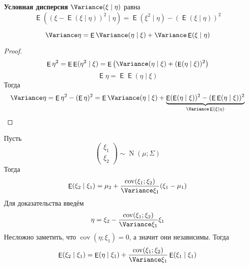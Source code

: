 \documentclass{article}
\DeclareMathOperator{\Expected}{\mathsf{E}}
\DeclareMathOperator{\Covariance}{cov}
\begin{document}
    \begin{definition}
        \textbf{Условная дисперсия} $\Variance(\xi\mid\eta)$ равна
        $$
        \Expected((\xi-\Expected(\xi\mid\eta))^2\mid\eta)=\Expected(\xi^2\mid\eta)-(\Expected(\xi\mid\eta))^2
        $$
    \end{definition}
    \begin{property}
        $$
        \Variance\eta=\Expected\Variance(\eta\mid\xi)+\Variance\Expected(\xi\mid\eta)
        $$
    \end{property}
    \begin{proof}
        $$
        \Expected\eta^2=\Expected\Expected(\eta^2\mid\xi)=\Expected\left(\Variance(\eta\mid\xi)+(\Expected(\eta\mid\xi))^2\right)
        $$
        $$
        \Expected\eta=\Expected\Expected(\eta\mid\xi)
        $$
        Тогда
        $$
        \Variance\eta=\Expected\eta^2-(\Expected\eta)^2=\Expected\Variance(\eta\mid\xi)+\underbrace{\Expected(\Expected(\eta\mid\xi))^2-(\Expected\Expected(\eta\mid\xi))^2}_{\Variance\Expected(\xi\mid\eta)}
        $$
    \end{proof}
    \begin{example}
        Пусть
        $$\left(\begin{matrix}
            \xi_1\\\xi_2
        \end{matrix}\right)\sim\hyperref[N (многомерное)]{\operatorname{N}}(\mu;\Sigma)$$
        Тогда
        $$
        \Expected(\xi_2\mid\xi_1)=\mu_2+\frac{\Covariance(\xi_1;\xi_2)}{\Variance\xi_1}(\xi_1-\mu_1)
        $$
        Для доказательства введём
        $$
        \eta=\xi_2-\frac{\Covariance(\xi_1;\xi_2)}{\Variance\xi_1}\xi_1
        $$
        Несложно заметить, что $\Covariance(\eta;\xi_1)=0$, а значит они независимы. Тогда
        $$
        \Expected(\xi_2\mid\xi_1)=\Expected(\eta\mid\xi_1)+\frac{\Covariance(\xi_1;\xi_2)}{\Variance\xi_1}\Expected(\xi_1\mid\xi_1)
        $$
    \end{example}
\end{document}
